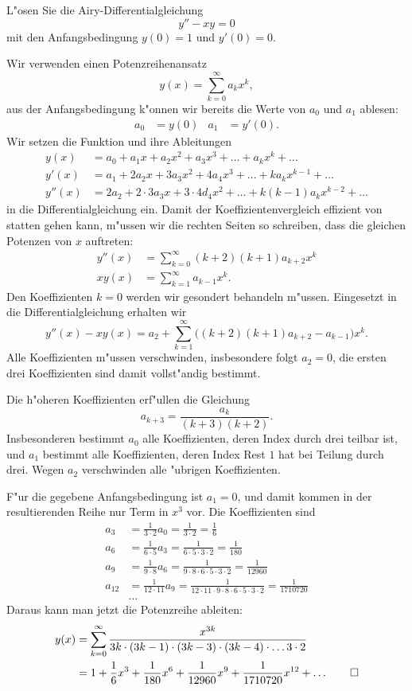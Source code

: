 L"osen Sie die Airy-Differentialgleichung
\[
y''-xy=0
\]
mit den Anfangsbedingung $y(0)=1$ und $y'(0)=0$.
%

\begin{loesung}
Wir verwenden einen Potenzreihenansatz
\[
y(x)=\sum_{k=0}^\infty a_kx^k,
\]
aus der Anfangsbedingung k"onnen wir bereits die Werte von $a_0$ und
$a_1$ ablesen:
\begin{align*}
a_0&=y(0)&
a_1&=y'(0).
\end{align*}
Wir setzen die Funktion und ihre Ableitungen
\begin{align*}
y(x)&=a_0+a_1x+a_2x^2+a_3x^3+\dots+a_kx^k+\dots
\\
y'(x)&=a_1+2a_2x+3a_3x^2+4a_4x^3+\dots+ka_kx^{k-1}+\dots
\\
y''(x)&=2a_2+2\cdot 3a_3x + 3\cdot 4d_4x^2+\dots +k(k-1)a_kx^{k-2}+\dots
\end{align*}
in die Differentialgleichung ein.
Damit der Koeffizientenvergleich effizient von statten gehen kann,
m"ussen wir die rechten Seiten so schreiben, dass die gleichen Potenzen
von $x$ auftreten:
\begin{align*}
y''(x)
&=
\sum_{k=0}^\infty (k+2)(k+1)a_{k+2}x^k
\\
xy(x)
&=
\sum_{k=1}^\infty a_{k-1}x^k.
\end{align*}
Den Koeffizienten $k=0$ werden wir gesondert behandeln m"ussen.
Eingesetzt in die Differentialgleichung erhalten wir
\[
y''(x)-xy(x)
=
a_2 + \sum_{k=1}^\infty \bigl((k+2)(k+1)a_{k+2}-a_{k-1}\bigr)x^k.
\]
Alle Koeffizienten m"ussen verschwinden, insbesondere folgt $a_2=0$,
die ersten drei Koeffizienten sind damit vollst"andig bestimmt.

Die h"oheren Koeffizienten erf"ullen die Gleichung
\[
a_{k+3}=\frac{a_k}{(k+3)(k+2)}.
\]
Insbesonderen bestimmt $a_0$ alle Koeffizienten, deren Index durch
drei teilbar ist, und $a_1$ bestimmt alle Koeffizienten, deren Index
Rest $1$ hat bei Teilung durch drei.
Wegen $a_2$ verschwinden alle "ubrigen Koeffizienten.

F"ur die gegebene Anfangsbedingung ist $a_1=0$, und damit kommen in der
resultierenden Reihe nur Term in $x^3$ vor.
Die Koeffizienten sind
\begin{align*}
a_3&=\frac1{3\cdot 2}a_0=\frac1{3\cdot 2}=\frac16\\
a_6&=\frac1{6\cdot 5}a_3=\frac1{6\cdot 5\cdot 3\cdot 2}=\frac1{180}\\
a_9&=\frac1{9\cdot 8}a_6=\frac1{9\cdot 8\cdot 6\cdot 5\cdot 3\cdot 2}=\frac1{12960}\\
a_{12}&=\frac1{12\cdot 11}a_9=\frac1{12\cdot 11\cdot 9\cdot 8\cdot 6\cdot 5\cdot 3\cdot 2}=\frac1{1710720}
\\
&\dots
\end{align*}
Daraus kann man jetzt die Potenzreihe ableiten:
\begin{align*}
y(x)
&=
\sum_{k=0}^\infty \frac{x^{3k}}{3k\cdot(3k-1)\cdot (3k-3)\cdot(3k-4)\cdot \dots 3\cdot 2}
\\
&=
1 + \frac16x^3+\frac1{180}x^6+\frac1{12960}x^9+\frac1{1710720}x^{12}+\dots
\qedhere
\end{align*}
\end{loesung}

